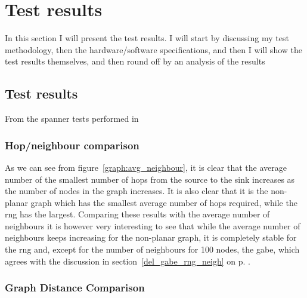 \section{Test results}
\label{section:test_results}
In this section I will present the test results. I will start by discussing my test methodology, then the hardware/software specifications, and then I will show the test results themselves, and then round off by an analysis of the results 

\subsection{Test results}
From the spanner tests performed in 

\subsubsection{Hop/neighbour comparison}
\label{section:hop_neighbour_comparison}

As we can see from figure~\ref{graph:avg_neighbour}, it is clear that the average number of the smallest number of hops from the source to the sink increases as the number of nodes in the graph increases. It is also clear that it is the non-planar graph which has the smallest average number of hops required, while the \ac{rng} has the largest. Comparing these results with the average number of neighbours it is however very interesting to see that while the average number of neighbours keeps increasing for the non-planar graph, it is completely stable for the \ac{rng} and, except for the number of neighbours for 100 nodes, the \ac{gabe}, which agrees with the discussion in section~\ref{del_gabe_rng_neigh} on p. \pageref{del_gabe_rng_neigh}. 

\subsubsection{Graph Distance Comparison}
\label{section:graph_distance_comparison}


